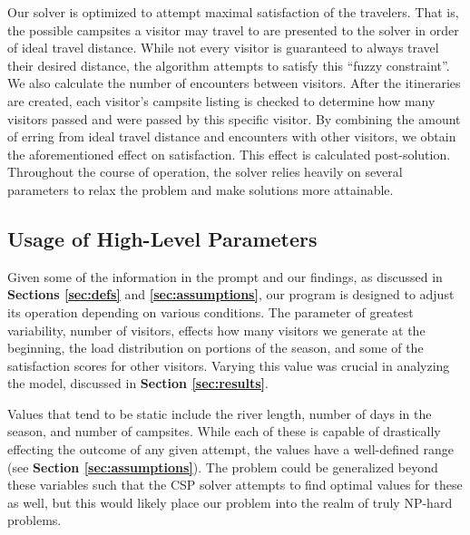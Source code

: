 \documentclass[11pt]{article} %
\begin{document}
Our solver is optimized to attempt maximal satisfaction of the travelers.
That is, the possible campsites a visitor may travel to are presented to the
solver in order of ideal travel distance.  While not every visitor is guaranteed
to always travel their desired distance, the algorithm attempts to satisfy
this ``fuzzy constraint''.  We also calculate the number of encounters
between visitors.  After the itineraries are created, each visitor's campsite
listing is checked to determine how many visitors passed and were passed by
this specific visitor.  By combining the amount of erring from ideal travel distance
and encounters with other visitors, we obtain the aforementioned effect on
satisfaction.  This effect is calculated post-solution.
Throughout the course of operation, the solver relies heavily on several
parameters to relax the problem and make solutions more attainable.

\subsection{Usage of High-Level Parameters}
\label{sec:high-params}
Given some of the information in the prompt and our findings, as discussed
in \textbf{Sections \ref{sec:defs}} and \textbf{\ref{sec:assumptions}}, our program
is designed to adjust its operation depending on various conditions.  The
parameter of greatest variability, number of  visitors, effects how
many visitors we generate at the beginning, the load distribution on portions
of the season, and some of the satisfaction scores for other visitors. Varying
this value was crucial in analyzing the model, discussed in \textbf{Section
\ref{sec:results}}.

Values that tend to be static include the river length, number of days in
the season, and number of campsites.  While each of these is capable of
drastically effecting the outcome of any given attempt, the values have a
well-defined range (see \textbf{Section \ref{sec:assumptions}}).  The problem
could be generalized beyond these variables such that the CSP solver attempts
to find optimal values for these as well, but this would likely place our
problem into the realm of truly NP-hard problems.
\end{document}
